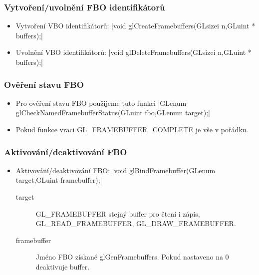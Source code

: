 \begin{frame}[fragile]
\frametitle{Vytvoření/uvolnění FBO identifikátorů}
  \begin{itemize}
    \item{
    Vytvoření VBO identifikátorů:
    {\scriptsize
    |void glCreateFramebuffers(GLsizei n,GLuint * buffers);|
    }}
    \item{
    Uvolnění VBO identifikátorů:
    {\scriptsize
    |void glDeleteFramebuffers(GLsizei n,GLuint * buffers);|
    }}
  \end{itemize}
\end{frame}

\begin{frame}[fragile]
\frametitle{Ověření stavu FBO}
  \begin{itemize}
    \item{
    Pro ověření stavu FBO použijeme tuto funkci
    {\scriptsize
    |GLenum glCheckNamedFramebufferStatus(GLuint fbo,GLenum target);|
    }}
    \item{
    Pokud funkce vraci {\color{red} GL\_FRAMEBUFFER\_COMPLETE} je vše v pořádku.
    }
  \end{itemize}
\end{frame}


\begin{frame}[fragile]
\frametitle{Aktivování/deaktivování FBO}
  \begin{itemize}
    \item{
    Aktivování/deaktivování FBO:
    {\scriptsize
    |void glBindFramebuffer(GLenum target,GLuint framebuffer);|
    }
    \begin{description}
    \item[target] GL\_FRAMEBUFFER stejný buffer pro čtení i zápis, GL\_READ\_FRAMEBUFFER, GL\_DRAW\_FRAMEBUFFER.
    \item[framebuffer] Jméno FBO získané {\color{blue} glGenFramebuffers}.
    Pokud nastaveno na 0 deaktivuje buffer.
    \end{description}
    }
  \end{itemize}
\end{frame}

